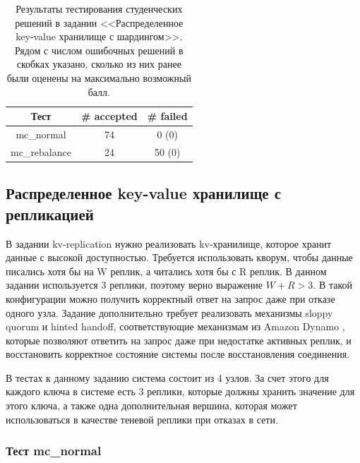 \documentclass[a4paper,12pt]{extarticle}
\begin{document}
\begin{table}[htbp]
    \caption{Результаты тестирования студенческих решений в задании <<Распределенное key-value хранилище с шардингом>>. Рядом с числом ошибочных решений в скобках указано, сколько из них ранее были оценены на максимально возможный балл. }
    \begin{center}
    \begin{tabular}{|c|c|c|}
    \hline
    \textbf{Тест} & \textbf{\# accepted} & \textbf{\# failed} \\
    \hline
    mc\_normal  & 74 & 0 (0) \\
    \hline
    mc\_rebalance  & 24 & 50 (0) \\
    \hline
    \end{tabular}
    \label{tab8}
    \end{center}
\end{table}

\subsection{Распределенное key-value хранилище с репликацией}
\label{KVREPLICATION}

В задании kv-replication нужно реализовать kv-хранилище, которое хранит данные с высокой доступностью.
Требуется использовать кворум, чтобы данные писались хотя бы на W реплик, а читались хотя бы с R реплик.
В данном задании используется 3 реплики, поэтому верно выражение $W+R>3$.
В такой конфигурации можно получить корректный ответ на запрос даже при отказе одного узла.
Задание дополнительно требует реализовать механизмы sloppy quorum и hinted handoff, соответствующие механизмам из Amazon Dynamo \cite{b29}, которые позволяют ответить на запрос даже при недостатке активных реплик, и восстановить корректное состояние системы после восстановления соединения. 

В тестах к данному заданию система состоит из 4 узлов.
За счет этого для каждого ключа в системе есть 3 реплики, которые должны хранить значение для этого ключа, а также одна дополнительная вершина, которая может использоваться в качестве теневой реплики при отказах в сети.


\subsubsection{Тест mc\_normal}
\label{kvreplication_test_1}
\end{document}

